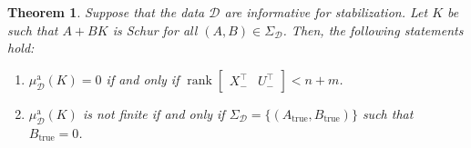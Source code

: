 \documentclass[9pt,shortpaper,twoside,web]{ieeecolor}
\DeclareMathOperator{\rank}{rank}
\newtheorem{theorem}{Theorem}
\begin{document}
\begin{theorem}
\label{prop:mu^a_bounded} 
Suppose that the data $\mathcal{D}$ are informative for stabilization. Let $K$ be such that $A+BK$ is Schur for all $(A,B)\in\Sigma_\mathcal{D}$. Then, the following statements hold:
\begin{enumerate}[label=(\alph*),ref=\ref{prop:mu^a_bounded}(\alph*)]
    \item\label{prop:mu^a_bounded(a)} $\mu_{\mathcal{D}}^{\text{a}}(K)=0$ \emph{if and only if} $\rank\begin{bmatrix}X_-^\top & U_-^\top\end{bmatrix}<n+m$.
    \item\label{prop:mu^a_bounded(b)} $\mu_{\mathcal{D}}^{\text{a}}(K)$ is not finite \emph{if and only if} $\Sigma_\mathcal{D}=\{(A_\text{true},B_\text{true})\}$ such that $B_\text{true}= 0$.
\end{enumerate}
\end{theorem}
\end{document}
